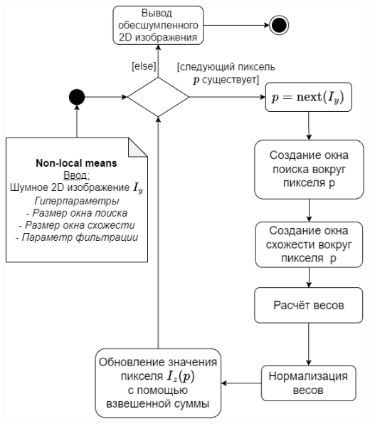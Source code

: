 \begin{minipage}{\textwidth}
	\centering
	\vspace{\mfloatsep} %
	\includegraphics[keepaspectratio=true,scale=0.47] {my_folder/images/denoising/pipeline_nlm_ru.png}
	\label{fig:nlm-schema}  
	\vspace{\mfloatsep} %
\end{minipage}

